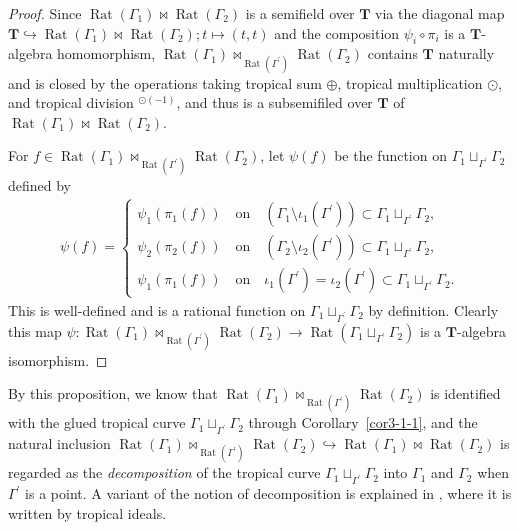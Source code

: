 \documentclass[a4paper,12pt]{amsart}
\def\Gamma{\varGamma}
\begin{document}
\begin{proof}
Since $\operatorname{Rat}(\Gamma_1) \bowtie \operatorname{Rat}(\Gamma_2)$ is a semifield over $\boldsymbol{T}$ via the diagonal map $\boldsymbol{T} \hookrightarrow \operatorname{Rat}(\Gamma_1) \bowtie \operatorname{Rat}(\Gamma_2); t \mapsto (t, t)$ and the composition $\psi_i \circ \pi_i$ is a $\boldsymbol{T}$-algebra homomorphism, $\operatorname{Rat}(\Gamma_1) \bowtie_{\operatorname{Rat}(\Gamma^{\prime})}\operatorname{Rat}(\Gamma_2)$ contains $\boldsymbol{T}$ naturally and is closed by the operations taking tropical sum $\oplus$, tropical multiplication $\odot$, and tropical division $^{\odot (-1)}$, and thus is a subsemifiled over $\boldsymbol{T}$ of $\operatorname{Rat}(\Gamma_1) \bowtie \operatorname{Rat}(\Gamma_2)$.

For $f \in \operatorname{Rat}(\Gamma_1) \bowtie_{\operatorname{Rat}(\Gamma^{\prime})} \operatorname{Rat}(\Gamma_2)$, let $\psi(f)$ be the function on $\Gamma_1 \sqcup_{\Gamma^{\prime}} \Gamma_2$ defined by
\begin{align*}
\psi(f) = \begin{cases}
\psi_1(\pi_1(f)) \quad \text{on} \quad (\Gamma_1 \setminus \iota_1(\Gamma^{\prime})) \subset \Gamma_1 \sqcup_{\Gamma^{\prime}} \Gamma_2,\\
\psi_2(\pi_2(f)) \quad \text{on} \quad (\Gamma_2 \setminus \iota_2(\Gamma^{\prime})) \subset \Gamma_1 \sqcup_{\Gamma^{\prime}} \Gamma_2,\\
\psi_1(\pi_1(f)) \quad \text{on} \quad \iota_1(\Gamma^{\prime}) = \iota_2(\Gamma^{\prime})  \subset \Gamma_1 \sqcup_{\Gamma^{\prime}} \Gamma_2.
\end{cases}
\end{align*}
This is well-defined and is a rational function on $\Gamma_1 \sqcup_{\Gamma^{\prime}} \Gamma_2$ by definition.
Clearly this map $\psi : \operatorname{Rat}(\Gamma_1) \bowtie_{\operatorname{Rat}(\Gamma^{\prime})} \operatorname{Rat}(\Gamma_2) \to \operatorname{Rat}(\Gamma_1 \sqcup_{\Gamma^{\prime}} \Gamma_2)$ is a $\boldsymbol{T}$-algebra isomorphism.
\end{proof}

By this proposition, we know that $\operatorname{Rat}(\Gamma_1) \bowtie_{\operatorname{Rat}(\Gamma^{\prime})} \operatorname{Rat}(\Gamma_2)$ is identified with the glued tropical curve $\Gamma_1 \sqcup_{\Gamma^{\prime}} \Gamma_2$ through Corollary~\ref{cor3-1-1}, and the natural inclusion $\operatorname{Rat}(\Gamma_1) \bowtie_{\operatorname{Rat}(\Gamma^{\prime})} \operatorname{Rat}(\Gamma_2) \hookrightarrow \operatorname{Rat}(\Gamma_1) \bowtie \operatorname{Rat}(\Gamma_2)$ is regarded as the \textit{decomposition} of the tropical curve $\Gamma_1 \sqcup_{\Gamma^{\prime}} \Gamma_2$ into $\Gamma_1$ and $\Gamma_2$ when $\Gamma^{\prime}$ is a point.
A variant of the notion of decomposition is explained in \cite[Example~2.7]{Maclagan=Rincon}, where it is written by tropical ideals.
\end{document}
